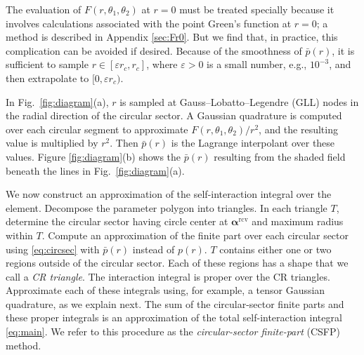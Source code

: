 \documentclass[11pt]{article}
\renewcommand{\vec}[1]{\boldsymbol{#1}}
\newcommand{\rmax}{r_c}
\newcommand{\suprcv}[1]{#1^{\mathrm{rcv}}}
\begin{document}
The evaluation of $F(r,\theta_1,\theta_2)$ at $r=0$ must be treated specially
because it involves calculations associated with the point Green's function at $r=0$;
a method is described in Appendix \ref{sec:Fr0}.
But we find that, in practice, this complication can be avoided if desired.
Because of the smoothness of $\bar{p}(r)$,
it is sufficient to sample $r \in [\varepsilon \rmax, \rmax]$,
where $\varepsilon > 0$ is a small number, e.g., $10^{-3}$,
and then extrapolate to $[0, \varepsilon \rmax)$.

In Fig.~\ref{fig:diagram}(a),
$r$ is sampled at Gauss--Lobatto--Legendre (GLL) nodes in the radial direction of the circular sector.
A Gaussian quadrature is computed over each circular segment to approximate $F(r,\theta_1,\theta_2)/r^2$,
and the resulting value is multiplied by $r^2$.
Then $\bar{p}(r)$ is the Lagrange interpolant over these values.
Figure \ref{fig:diagram}(b) shows the $\bar{p}(r)$ resulting from the shaded field
beneath the lines in Fig.~\ref{fig:diagram}(a).

We now construct an approximation of the self-interaction integral over the element.
Decompose the parameter polygon into triangles.
In each triangle $T$,
determine the circular sector having circle center at $\suprcv{\vec{\alpha}}$ and maximum radius within $T$.
Compute an approximation of the finite part over each circular sector
using \eqref{eq:circsec} with $\bar{p}(r)$ instead of $p(r)$.
$T$ contains either one or two regions outside of the circular sector.
Each of these regions has a shape that we call a \emph{CR triangle}.
The interaction integral is proper over the CR triangles.
Approximate each of these integrals using, for example, a tensor Gaussian quadrature,
as we explain next.
The sum of the circular-sector finite parts and these proper integrals
is an approximation of
the total self-interaction integral \eqref{eq:main}.
We refer to this procedure as the \emph{circular-sector finite-part} (CSFP) method.
\end{document}
